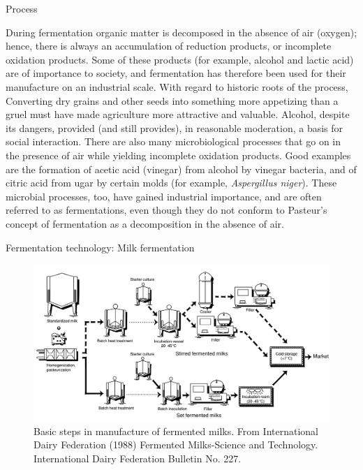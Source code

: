 \documentclass[ignorenonframetext,aspectratio=169]{beamer}
\begin{document}
\begin{frame}{Process}
\protect\hypertarget{process}{}

During fermentation organic matter is decomposed in the absence of air
(oxygen); hence, there is always an accumulation of reduction products,
or incomplete oxidation products. Some of these products (for example,
alcohol and lactic acid) are of importance to society, and fermentation
has therefore been used for their manufacture on an industrial scale.
With regard to historic roots of the process, Converting dry grains and
other seeds into something more appetizing than a gruel must have made
agriculture more attractive and valuable. Alcohol, despite its dangers,
provided (and still provides), in reasonable moderation, a basis for
social interaction. There are also many microbiological processes that
go on in the presence of air while yielding incomplete oxidation
products. Good examples are the formation of acetic acid (vinegar) from
alcohol by vinegar bacteria, and of citric acid from ugar by certain
molds (for example, \emph{Aspergillus niger}). These microbial
processes, too, have gained industrial importance, and are often
referred to as fermentations, even though they do not conform to
Pasteur's concept of fermentation as a decomposition in the absence of
air.

\end{frame}

\begin{frame}{Fermentation technology: Milk fermentation}
\protect\hypertarget{fermentation-technology-milk-fermentation}{}

\begin{figure}
\includegraphics[width=0.55\linewidth]{../images/milk_fermentation} \caption{Basic steps in manufacture of fermented milks. From International Dairy Federation (1988) Fermented Milks-Science and Technology. International Dairy Federation Bulletin No. 227.}\label{fig:milk-fermentation-steps}
\end{figure}

\end{frame}
\end{document}
